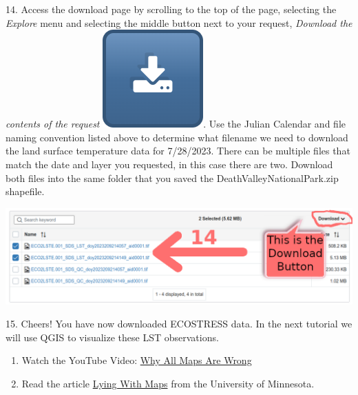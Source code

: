 \documentclass[oneside,a4paper,11pt,explicit]{book}
\begin{document}
14. Access the download page by scrolling to the top of the page, selecting the \textit{Explore} menu and selecting the middle button next to your request, \textit{Download the contents of the request} \includegraphics[height=\fontcharht\font`\B]{DownloadButton.png}. Use the Julian Calendar and file naming convention listed above to determine what filename we need to download the land surface temperature data for 7/28/2023. There can be multiple files that match the date and layer you requested, in this case there are two. Download both files into the same folder that you saved the DeathValleyNationalPark.zip shapefile.

\centerline{\includegraphics[width=\textwidth]{DownloadInstructions.png}}

15. Cheers! You have now downloaded ECOSTRESS data. In the next tutorial we will use QGIS to visualize these LST observations.

\begin{tcolorbox}[colback=yellow!5!white,colframe=IceCreamOrbit,title= \vspace{.2em} \Large Map of the Week Assignments]
	\large
	\begin{enumerate}
		\item Watch the YouTube Video: \href{https://youtu.be/kIID5FDi2JQ}{Why All Maps Are Wrong}
		\item Read the article \href{https://open.lib.umn.edu/mapping/chapter/7-lying-with-maps/}{Lying With Maps} from the University of Minnesota. 
	\end{enumerate}
\end{tcolorbox}
\end{document}
